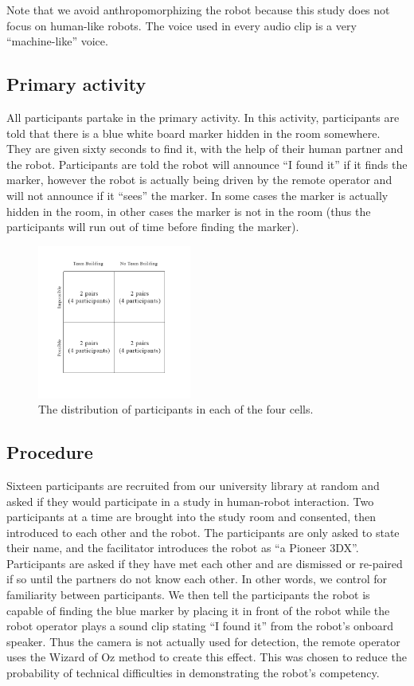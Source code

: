 \documentclass{acm_proc_article-sp}
\begin{document}
Note that we avoid anthropomorphizing the robot because this study does not focus on human-like robots. The voice used in every audio clip is a very ``machine-like'' voice.
\subsection{Primary activity}
\label{section:primary-activity}
All participants partake in the primary activity. In this activity, participants are told that there is a blue white board marker hidden in the room somewhere. They are given sixty seconds to find it, with the help of their human partner and the robot. Participants are told the robot will announce ``I found it'' if it finds the marker, however the robot is actually being driven by the remote operator and will not announce if it ``sees'' the marker. In some cases the marker is actually hidden in the room, in other cases the marker is not in the room (thus the participants will run out of time before finding the marker). 

\begin{figure}[here]
\includegraphics[width=0.45\textwidth]{participants.png}
\caption{The distribution of participants in each of the four cells.}
\label{fig:participantdistro}
\end{figure}

\subsection{Procedure}
Sixteen participants are recruited from our university library at random and asked if they would participate in a study in human-robot interaction. Two participants at a time are brought into the study room and consented, then introduced to each other and the robot. The participants are only asked to state their name, and the facilitator introduces the robot as ``a Pioneer 3DX''. Participants are asked if they have met each other and are dismissed or re-paired if so until the partners do not know each other. In other words, we control for familiarity between participants. We then tell the participants the robot is capable of finding the blue marker by placing it in front of the robot while the robot operator plays a sound clip stating ``I found it'' from the robot's onboard speaker. Thus the camera is not actually used for detection, the remote operator uses the Wizard of Oz method to create this effect. This was chosen to reduce the probability of technical difficulties in demonstrating the robot's competency.
\end{document}
